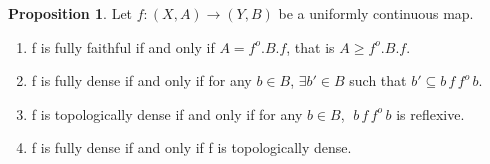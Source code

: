 \documentclass[a4paper]{article}
\theoremstyle{definition}
\newtheorem{prop}[theorem]{Proposition}
\begin{document}
			\begin{prop}
				Let $f:(X,A) \rightarrow (Y,B)$ be a uniformly continuous map.
				\begin{enumerate}[label=(\alph*)]
					\item f is fully faithful if and only if $A= f^o.B.f$, that is
						$A\geq f^o.B.f$.
					\item f is fully dense if and only if for any $b\in B$, $\exists b' \in B$
						such that $b' \subseteq b\,f\,f^o \,b$.
					\item f is topologically dense if and only if for any $b\in B$,
						$\; b \, f\, f^o\,b$ is reflexive.
					\item f is fully dense if and only if f is topologically dense.
				\end{enumerate}
			\end{prop}
\end{document}
